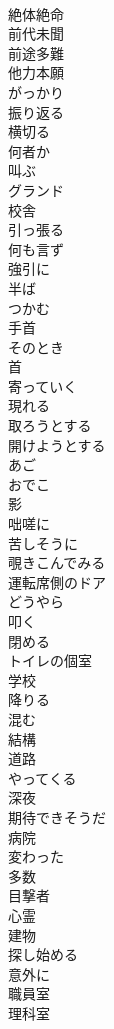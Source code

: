 \documentclass[8pt]{extreport}
\begin{document}
\begin{CJK}{UTF8}{min}
\\	絶体絶命
\\	前代未聞
\\	前途多難
\\	他力本願
\\	がっかり
\\	振り返る
\\	横切る
\\	何者か
\\	叫ぶ
\\	グランド
\\	校舎
\\	引っ張る
\\	何も言ず
\\	強引に
\\	半ば
\\	つかむ
\\	手首
\\	そのとき
\\	首
\\	寄っていく
\\	現れる
\\	取ろうとする
\\	開けようとする
\\	あご
\\	おでこ
\\	影
\\	咄嗟に
\\	苦しそうに
\\	覗きこんでみる
\\	運転席側のドア
\\	どうやら
\\	叩く
\\	閉める
\\	トイレの個室
\\	学校
\\	降りる
\\	混む
\\	結構
\\	道路
\\	やってくる
\\	深夜
\\	期待できそうだ
\\	病院
\\	変わった
\\	多数
\\	目撃者
\\	心霊
\\	建物
\\	探し始める
\\	意外に
\\	職員室
\\	理科室

\end{CJK}
\end{document}

